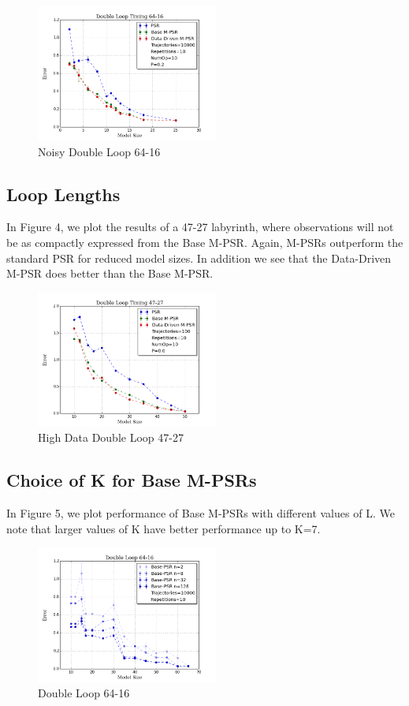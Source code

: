 \begin{figure}[ht!]
\centering
\includegraphics[width=60mm]{uCOREPICS/DL/NoiseInfo.png}
\caption{Noisy Double Loop 64-16\label{overflow}}
\end{figure}

\subsection{Loop Lengths}

In Figure 4, we plot the results of a 47-27 labyrinth, where observations will not be as compactly expressed from the Base M-PSR. Again, M-PSRs outperform the standard PSR for reduced model sizes. In addition we see that the Data-Driven M-PSR does better than the Base M-PSR.

\begin{figure}[ht!]
\centering
\includegraphics[width=60mm]{uCOREPICS/DL/47-27-10000.png}
\caption{High Data Double Loop 47-27\label{overflow}}
\end{figure}

\subsection{Choice of K for Base M-PSRs}

In Figure 5, we plot performance of Base M-PSRs with different values of L. We note that larger values of K have better performance up to K=7.

\begin{figure}[ht!]
\centering
\includegraphics[width=60mm]{uCOREPICS/DL/basePows.png}
\caption{Double Loop 64-16\label{overflow}}
\end{figure}

